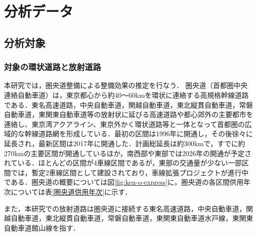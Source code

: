 \chapter{分析データ}

\section{分析対象}
\subsection{対象の環状道路と放射道路}
本研究では，圏央道整備による整備効果の推定を行なう．
圏央道（首都圏中央連絡自動車道）は，東京都心から約40〜60kmを環状に連絡する高規格幹線道路である．東名高速道路，中央自動車道，関越自動車道，東北縦貫自動車道，常磐自動車道，東関東自動車道等の放射状に延びる高速道路や都心郊外の主要都市を連絡し、東京湾アクアライン、東京外かく環状道路等と一体となって首都圏の広域的な幹線道路網を形成している\cite{kokudo2024}．最初の区間は1996年に開通し，その後徐々に延長され，最新区間は2017年に開通した．計画総延長は約300kmで，すでに約270kmの主要区間が開通しているほか，南西部や東部では2026年の開通が予定されている．ほとんどの区間が4車線区間であるが，東部の交通量が少ない一部区間では，暫定2車線区間として建設されており，車線拡張プロジェクトが進行中である．圏央道の概要については図\ref{fig:ken-o-express}に，圏央道の各区間供用年次については表\ref{圏央道供用年次}に示す．

また，本研究での放射道路は圏央道に接続する東名高速道路，中央自動車道，関越自動車道，東北縦貫自動車道，常磐自動車道，東関東自動車道水戸線，東関東自動車道館山線を指す．

